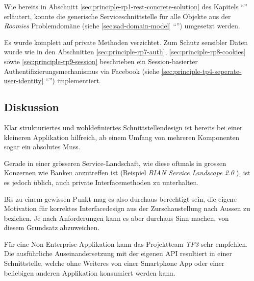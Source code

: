 Wie bereits in Abschnitt \ref{sec:principle-rp1-rest-concrete-solution} des Kapitels ``'' erläutert, konnte die generische Serviceschnittstelle für alle Objekte aus der \emph{Roomies} Problemdomäne (siehe \ref{sec:sad-domain-model} ``'') umgesetzt werden.

Es wurde komplett auf private Methoden verzichtet. Zum Schutz sensibler Daten wurde wie in den Abschnitten \ref{sec:principle-rp7-auth}, \ref{sec:principle-rp8-cookies} sowie \ref{sec:principle-rp9-session} beschrieben ein Session-basierter Authentifizierungsmechanismus via Facebook (siehe \ref{sec:principle-tp4-seperate-user-identity} ``'') implementiert.


\subsection*{Diskussion}

Klar strukturiertes und wohldefiniertes Schnittstellendesign ist bereits bei einer kleineren Applikation hilfreich, ab einem Umfang von mehreren Komponenten sogar ein absolutes Muss.

Gerade in einer grösseren Service-Landschaft, wie diese oftmals in grossen Konzernen wie Banken anzutreffen ist (Beispiel \emph{BIAN Service Landscape 2.0} \cite{BIANServiceLandscape}), ist es jedoch üblich, auch private Interfacemethoden zu unterhalten.

Bis zu einem gewissen Punkt mag es also durchaus berechtigt sein, die eigene Motivation für korrektes Interfacedesign aus der Zurschaustellung nach Aussen zu beziehen. Je nach Anforderungen kann es aber durchaus Sinn machen, von diesem Grundsatz abzuweichen.

Für eine Non-Enterprise-Applikation kann das Projektteam \emph{TP3} sehr empfehlen. Die ausführliche Auseinandersetzung mit der eigenen API resultiert in einer Schnittstelle, welche ohne Weiteres von einer Smartphone App oder einer beliebigen anderen Applikation konsumiert werden kann.